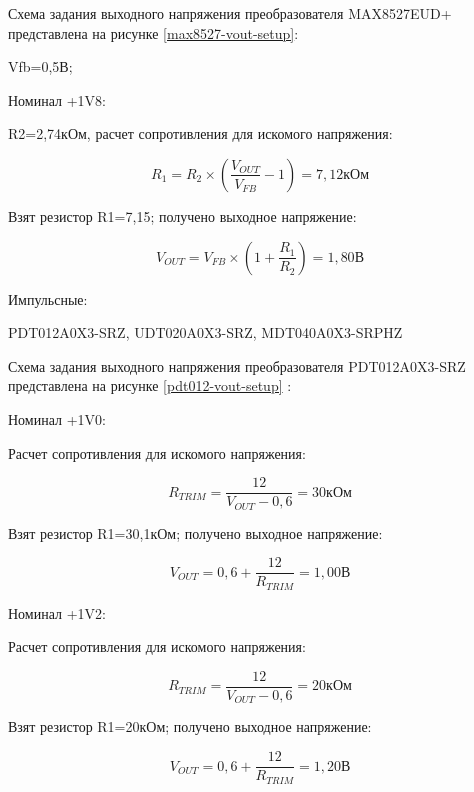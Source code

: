 Схема задания выходного напряжения преобразователя MAX8527EUD+ представлена на рисунке \ref{max8527-vout-setup}:
 \cite{max8527-c}

Vfb=0,5В; 

Номинал +1V8:

R2=2,74кОм, расчет сопротивления для искомого напряжения:

\begin{equation}
R_{1} = R_{2} \times \left(\frac{V_{OUT}}{V_{FB}} - 1 \right) = 7,12\text{кОм}
\end{equation}

Взят резистор R1=7,15; получено выходное напряжение:

\begin{equation}
V_{OUT} = V_{FB} \times \left(1 + \frac{R_{1}}{R_{2}} \right) = 1,80\text{В}
\end{equation}

Импульсные:

PDT012A0X3-SRZ, UDT020A0X3-SRZ, MDT040A0X3-SRPHZ

Схема задания выходного напряжения преобразователя PDT012A0X3-SRZ представлена на рисунке \ref{pdt012-vout-setup}  \cite{pdt012-c}:

Номинал +1V0:

Расчет сопротивления для искомого напряжения:

\begin{equation}
R_{TRIM} = \frac{12}{V_{OUT}-0,6} = 30\text{кОм}
\end{equation}

Взят резистор R1=30,1кОм; получено выходное напряжение:

\begin{equation}
V_{OUT} = 0,6 + \frac{12}{R_{TRIM}} = 1,00\text{В}
\end{equation}

Номинал +1V2:

Расчет сопротивления для искомого напряжения:

\begin{equation}
R_{TRIM} = \frac{12}{V_{OUT}-0,6} = 20\text{кОм}
\end{equation}

Взят резистор R1=20кОм; получено выходное напряжение:

\begin{equation}
V_{OUT} = 0,6 + \frac{12}{R_{TRIM}} = 1,20\text{В}
\end{equation}


